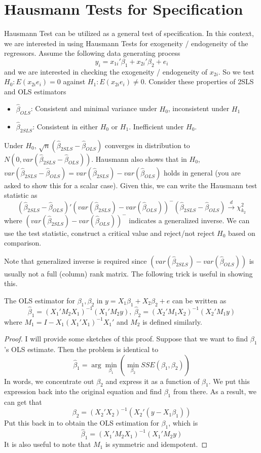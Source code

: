 \section{Hausmann Tests for Specification}
Hausmann Test can be utilized as a general test of specification. In this context, we are interested in using Hausmann Tests for exogeneity / endogeneity of the regressors. Assume the following data generating process
\[
y_i = x_{1i}'\beta_1 + x_{2i}'\beta_2+e_i
\]
and we are interested in checking the exogeneity / endogeneity of $x_{2i}$. So we test $H_0: E(x_{2i}e_i)=0$ against $H_1:E(x_{2i}e_i)\neq0$. Consider these properties of 2SLS and OLS estimators
\begin{itemize}
\item $\hat{\beta}_{OLS}$: Consistent and minimal variance under $H_0$, inconsistent under $H_1$
\item $\hat{\beta}_{2SLS}$:  Consistent in either $H_0$ or $H_1$. Inefficient under $H_0$. 
\end{itemize}
Under $H_0$, $\sqrt{n}(\hat{\beta}_{2SLS}-\hat{\beta}_{OLS})$ converges in distribution to $N(0, var(\hat{\beta}_{2SLS}-\hat{\beta}_{OLS}))$. Hausmann also shows that in $H_0$, $var(\hat{\beta}_{2SLS}-\hat{\beta}_{OLS})=var(\hat{\beta}_{2SLS})-var(\hat{\beta}_{OLS})$ holds in general (you are asked to show this for a scalar case). Given this, we can write the Hausmann test statistic as 
\[
(\hat{\beta}_{2SLS}-\hat{\beta}_{OLS})'(var(\hat{\beta}_{2SLS})-var(\hat{\beta}_{OLS}))^-(\hat{\beta}_{2SLS}-\hat{\beta}_{OLS})\xrightarrow{d}\chi_{k_2}^2
\]
where $(var(\hat{\beta}_{2SLS})-var(\hat{\beta}_{OLS}))^-$ indicates a generalized inverse. We can use the test statistic, construct a critical value and reject/not reject $H_0$ based on comparison.\par
Note that  generalized inverse is required since $(var(\hat{\beta}_{2SLS})-var(\hat{\beta}_{OLS}))$ is usually not a full (column) rank matrix. The following trick is useful in showing this.
\begin{mdframed}[backgroundcolor=blue!5] 
\begin{lemma}
The OLS estimator for $\beta_1, \beta_2$ in $y=X_1\beta_1 + X_2\beta_2+e$ can be written as
\[
\hat{\beta}_1=(X_1'M_2X_1)^{-1}(X_1'M_2y),\ \hat{\beta}_2=(X_2'M_1X_2)^{-1}(X_2'M_1y)
\]
where $M_1 = I-X_1(X_1'X_1)^{-1}X_1'$ and $M_2$ is defined similarly.
\begin{proof}
I will provide some sketches of this proof. Suppose that we want to find $\beta_1$'s OLS estimate. Then the problem is identical to
\[
\hat{\beta}_1 = \arg\min_{\beta_1}(\min_{\beta_2}SSE(\beta_1, \beta_2))
\]
In words, we concentrate out $\beta_2$ and express it as a function of $\beta_1$. We put this expression back into the original equation and find $\beta_1$ from there. As a result, we can get that
\[
\beta_2 = (X_2'X_2)^{-1}(X_2'(y-X_1\beta_1))
\]
Put this back in to obtain the OLS estimation for $\beta_1$, which is
\[
\hat{\beta}_1=(X_1'M_2X_1)^{-1}(X_1'M_2y)
\]
It is also useful to note that $M_1$ is symmetric and idempotent. 
\end{proof}
\end{lemma}
\end{mdframed}
